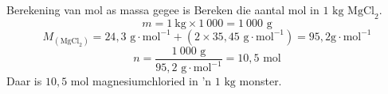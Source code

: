             \label{m38717*secfhsst!!!underscore!!!id641} 
      \begin{wex}{Berekening van mol as massa gegee is}
{
Bereken die aantal mol in $1\text{ kg}$ $\text{MgCl}_{2}$.
     }
{
\label{m38717*id278854}\nopagebreak\noindent{}
    \begin{equation*}
    m = 1~\text{kg} \times 1 ~000=1 ~000\text{ g}
      \end{equation*}
\label{m38717*id278912}\nopagebreak\noindent{}
    \begin{equation*}
    {M}_{(\text{MgCl}_{2})} = 24,3 \text{ g} \cdot \text{mol}^{-1} + (2 \times 35,45 \text{ g} \cdot \text{mol}^{-1}) = 95,2 \text{g} \cdot \text{mol}^{-1}
      \end{equation*}    
      \label{m38717*id279005}\nopagebreak\noindent{}
    \begin{equation*}
    n=\frac{1~000 \text{ g}}{95,2 \text{ g} \cdot \text{mol}^{-1}} = 10,5 \text{ mol}
      \end{equation*}
      \label{m38717*id279046}Daar is $10,5 \text{ mol}$ magnesiumchloried in 'n $1 \text{ kg}$ monster.
}
    \end{wex}
\label{m38717*secfhsst!!!underscore!!!id832}
